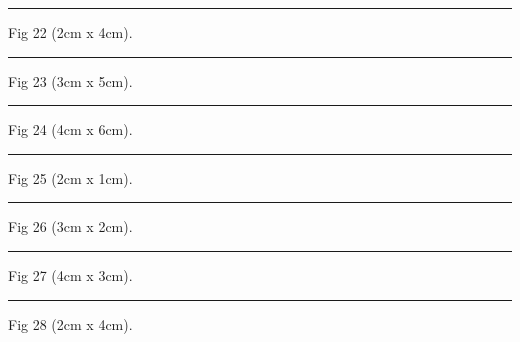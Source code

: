\documentclass[a4paper,11pt]{article}
\begin{document}
\begin{swarmwrap}%
  \begin{minipage}[t]{2cm}
    \centering
    \rule{\linewidth}{4cm}
    {\footnotesize Fig 22 (2cm x 4cm).}
  \end{minipage}%
\end{swarmwrap}%
\swarmwrapnext
\lipsum[22]%

\begin{swarmwrap}%
  \begin{minipage}[t]{3cm}
    \centering
    \rule{\linewidth}{5cm}
    {\footnotesize Fig 23 (3cm x 5cm).}
  \end{minipage}%
\end{swarmwrap}%
\swarmwrapnext
\lipsum[23]%

\begin{swarmwrap}%
  \begin{minipage}[t]{4cm}
    \centering
    \rule{\linewidth}{6cm}
    {\footnotesize Fig 24 (4cm x 6cm).}
  \end{minipage}%
\end{swarmwrap}%
\swarmwrapnext
\lipsum[24]%

\begin{swarmwrap}%
  \begin{minipage}[t]{2cm}
    \centering
    \rule{\linewidth}{1cm}
    {\footnotesize Fig 25 (2cm x 1cm).}
  \end{minipage}%
\end{swarmwrap}%
\swarmwrapnext
\lipsum[25]%

\begin{swarmwrap}%
  \begin{minipage}[t]{3cm}
    \centering
    \rule{\linewidth}{2cm}
    {\footnotesize Fig 26 (3cm x 2cm).}
  \end{minipage}%
\end{swarmwrap}%
\swarmwrapnext
\lipsum[26]%

\begin{swarmwrap}%
  \begin{minipage}[t]{4cm}
    \centering
    \rule{\linewidth}{3cm}
    {\footnotesize Fig 27 (4cm x 3cm).}
  \end{minipage}%
\end{swarmwrap}%
\swarmwrapnext
\lipsum[27]%

\begin{swarmwrap}%
  \begin{minipage}[t]{2cm}
    \centering
    \rule{\linewidth}{4cm}
    {\footnotesize Fig 28 (2cm x 4cm).}
  \end{minipage}%
\end{swarmwrap}%
\swarmwrapnext
\lipsum[28]%
\end{document}
